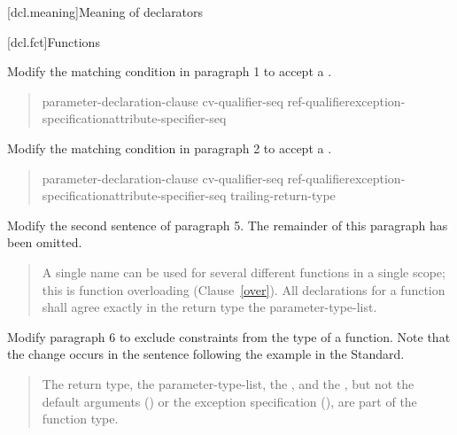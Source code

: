 \setcounter{section}{2}
[dcl.meaning]{Meaning of declarators}


\setcounter{subsection}{4}
[dcl.fct]{Functions}

Modify the matching condition in paragraph 1 to accept a 
.
      
\begin{quote}
\pnum
\begin{bnf}
 \terminal{(} parameter-declaration-clause \terminal{)} cv-qualifier-seq\opt\br
  \hspace*{\bnfindentinc}ref-qualifier\opt exception-specification\opt attribute-specifier-seq\opt\br
  \hspace*{\bnfindentinc}
\end{bnf}
\end{quote}

Modify the matching condition in paragraph 2 to accept a 
.

\begin{quote}
\pnum
\begin{bnf}
 \terminal{(} parameter-declaration-clause \terminal{)} cv-qualifier-seq\opt\br 
  \hspace*{\bnfindentinc}ref-qualifier\opt exception-specification\opt attribute-specifier-seq\opt\br
  \hspace*{\bnfindentinc}trailing-return-type 
\end{bnf}
\end{quote}


Modify the second sentence of paragraph 5. The remainder of this
paragraph has been omitted.

\begin{quote}
\setcounter{Paras}{4}
\pnum
A single name can be used for several different functions in a single 
scope; this is function overloading (Clause~\ref{over}). 
%
All declarations for a function shall agree exactly in  
the return type\added{,}  the parameter-type-list.
\end{quote}

Modify paragraph 6 to exclude constraints from the type of a function.
Note that the change occurs in the sentence following the example
in the \Cpp Standard.

\begin{quote}
\pnum
The return type, the parameter-type-list, the , 
and the , but not the default arguments
() or
the exception specification (), are part of the function 
type.
\end{quote}

